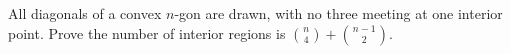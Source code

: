 All diagonals of a convex $n$-gon are drawn, with no three meeting at one interior point. Prove the number of interior regions is $\binom n4+\binom{n-1}2$.
